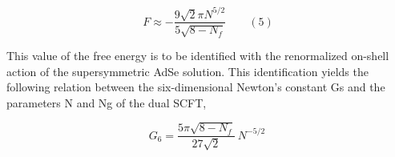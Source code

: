 \documentclass{article}
\begin{document}
\begin{equation}
F \approx - \frac { 9 \sqrt { 2 } \pi N ^ { 5 / 2 } } { 5 \sqrt { 8 - N _ { f } } } \qquad ( 5 )
\end{equation}


This value of the free energy is to be identified with the renormalized on-shell action of the
supersymmetric AdSe solution. This identification yields the following relation between the
six-dimensional Newton's constant Gs and the parameters N and Ng of the dual SCFT,


\begin{equation}
G _ { 6 } = \frac { 5 \pi \sqrt { 8 - N _ { f } } } { 2 7 \sqrt { 2 } } ~ N ^ { - 5 / 2 } ~
\end{equation}
\end{document}

